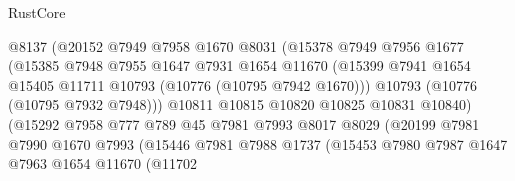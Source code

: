 \begin{lexlean}{RustCore}
\begin{coremodule}
                                @8137
                                (@20152
                                  @7949
                                  @7958
                                  @1670
                                  @8031
                                  (@15378
                                    @7949
                                    @7956
                                    @1677
                                    (@15385
                                      @7948
                                      @7955
                                      @1647
                                      @7931
                                      @1654
                                      @11670
                                      (@15399
                                        @7941
                                        @1654
                                        @15405
                                        @11711
                                        @10793
                                        (@10776 (@10795 @7942 @1670)))
                                      @10793
                                      (@10776 (@10795 @7932 @7948)))
                                    @10811
                                    @10815
                                    @10820
                                    @10825
                                    @10831
                                    @10840)
                                  (@15292
                                    @7958
                                    @777
                                    @789
                                    @45
                                    @7981
                                    @7993
                                    @8017
                                    @8029
                                    (@20199
                                      @7981
                                      @7990
                                      @1670
                                      @7993
                                      (@15446
                                        @7981
                                        @7988
                                        @1737
                                        (@15453
                                          @7980
                                          @7987
                                          @1647
                                          @7963
                                          @1654
                                          @11670
                                          (@11702

\end{coremodule}
\end{lexlean}
